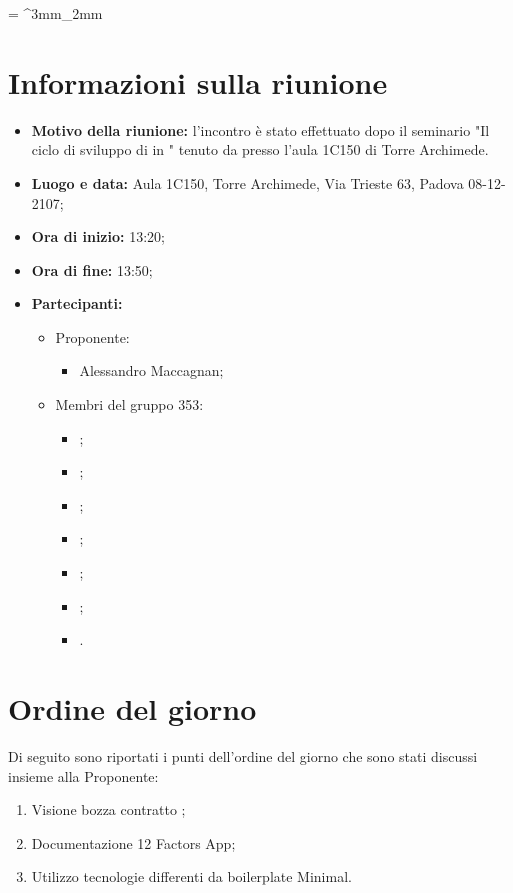 \documentclass[VER-2018-01-09.tex]{subfiles}
\begin{document}
\tabulinesep = ^3mm_2mm
\chapter{Informazioni sulla riunione}
\begin{itemize}
	\item \textbf{Motivo della riunione:} l'incontro è stato effettuato dopo il seminario "Il ciclo di sviluppo di  in " tenuto da \Proponente presso l'aula 1C150 di Torre Archimede.

	\item \textbf{Luogo e data:} Aula 1C150, Torre Archimede, Via Trieste 63, Padova 08-12-2107;
	\item \textbf{Ora di inizio:} 13:20;
	\item \textbf{Ora di fine:} 13:50;
	\item \textbf{Partecipanti:}
	\begin{itemize}
		\item Proponente:
		\begin{itemize}
			\item Alessandro Maccagnan;
		\end{itemize}
		\item Membri del gruppo 353:
		\begin{itemize}
			\item \Davide;
			\item \Elena;
			\item \Gianluca;
			\item \Mirco;
			\item \Parwinder;
			\item \Riccardo;
			\item \Valentina.
		\end{itemize}
	\end{itemize}
\end{itemize}
\chapter{Ordine del giorno}	
Di seguito sono riportati i punti dell'ordine del giorno che sono stati discussi insieme alla Proponente:
\begin{enumerate}
	\item Visione bozza contratto ; 
	\item Documentazione 12 Factors App;
	\item Utilizzo tecnologie differenti da boilerplate  Minimal.
\end{enumerate}
\end{document}

